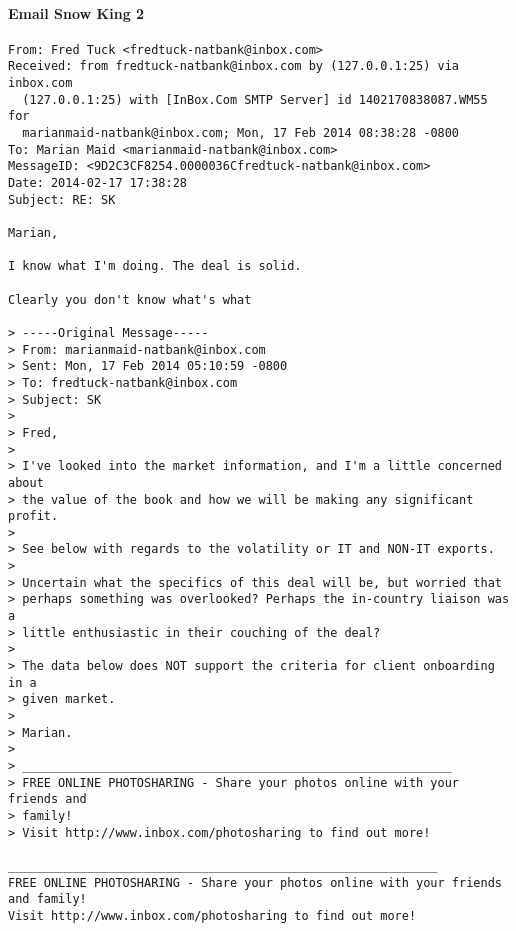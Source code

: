 \paragraph{Email Snow King 2}
\label{SnowKing2}
\begin{verbatim}
From: Fred Tuck <fredtuck-natbank@inbox.com>
Received: from fredtuck-natbank@inbox.com by (127.0.0.1:25) via inbox.com
  (127.0.0.1:25) with [InBox.Com SMTP Server] id 1402170838087.WM55 for
  marianmaid-natbank@inbox.com; Mon, 17 Feb 2014 08:38:28 -0800
To: Marian Maid <marianmaid-natbank@inbox.com>
MessageID: <9D2C3CF8254.0000036Cfredtuck-natbank@inbox.com>
Date: 2014-02-17 17:38:28
Subject: RE: SK

Marian,

I know what I'm doing. The deal is solid.

Clearly you don't know what's what

> -----Original Message-----
> From: marianmaid-natbank@inbox.com
> Sent: Mon, 17 Feb 2014 05:10:59 -0800
> To: fredtuck-natbank@inbox.com
> Subject: SK
> 
> Fred,
> 
> I've looked into the market information, and I'm a little concerned about
> the value of the book and how we will be making any significant profit.
> 
> See below with regards to the volatility or IT and NON-IT exports.
> 
> Uncertain what the specifics of this deal will be, but worried that
> perhaps something was overlooked? Perhaps the in-country liaison was a
> little enthusiastic in their couching of the deal?
> 
> The data below does NOT support the criteria for client onboarding in a
> given market.
> 
> Marian.
> 
> ____________________________________________________________
> FREE ONLINE PHOTOSHARING - Share your photos online with your friends and
> family!
> Visit http://www.inbox.com/photosharing to find out more!

____________________________________________________________
FREE ONLINE PHOTOSHARING - Share your photos online with your friends and family!
Visit http://www.inbox.com/photosharing to find out more!


\end{verbatim}

